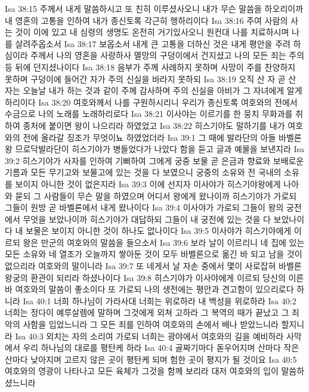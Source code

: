 Isa 38:15  주께서 내게 말씀하시고 또 친히 이루셨사오니 내가 무슨 말씀을 하오리이까 내 영혼의 고통을 인하여 내가 종신토록 각근히 행하리이다
Isa 38:16  주여 사람의 사는 것이 이에 있고 내 심령의 생명도 온전히 거기있사오니 원컨대 나를 치료하시며 나를 살려주옵소서
Isa 38:17  보옵소서 내게 큰 고통을 더하신 것은 내게 평안을 주려 하심이라 주께서 나의 영혼을 사랑하사 멸망의 구덩이에서 건지셨고 나의 모든 죄는 주의 등 뒤에 던지셨나이다
Isa 38:18  음부가 주께 사례하지 못하며 사망이 주를 찬양하지 못하며 구덩이에 들어간 자가 주의 신실을 바라지 못하되
Isa 38:19  오직 산 자 곧 산 자는 오늘날 내가 하는 것과 같이 주께 감사하며 주의 신실을 아비가 그 자녀에게 알게 하리이다
Isa 38:20  여호와께서 나를 구원하시리니 우리가 종신토록 여호와의 전에서 수금으로 나의 노래를 노래하리로다
Isa 38:21  이사야는 이르기를 한 뭉치 무화과를 취하여 종처에 붙이면 왕이 나으리라 하였었고
Isa 38:22  히스기야도 말하기를 내가 여호와의 전에 올라갈 징조가 무엇이뇨 하였었더라
Isa 39:1  그 때에 발라단의 아들 바벨론 왕 므로닥발라단이 히스기야가 병들었다가 나았다 함을 듣고 글과 예물을 보낸지라
Isa 39:2  히스기야가 사자를 인하여 기뻐하여 그에게 궁중 보물 곧 은금과 향료와 보배로운 기름과 모든 무기고와 보물고에 있는 것을 다 보였으니 궁중의 소유와 전 국내의 소유를 보이지 아니한 것이 없은지라
Isa 39:3  이에 선지자 이사야가 히스기야왕에게 나아와 묻되 그 사람들이 무슨 말을 하였으며 어디서 왕에게 왔나이까 히스기야가 가로되 그들이 원방 곧 바벨론에서 내게 왔나이다
Isa 39:4  이사야가 가로되 그들이 왕의 궁전에서 무엇을 보았나이까 히스기야가 대답하되 그들이 내 궁전에 있는 것을 다 보았나이다 내 보물은 보이지 아니한 것이 하나도 없나이다
Isa 39:5  이사야가 히스기야에게 이르되 왕은 만군의 여호와의 말씀을 들으소서
Isa 39:6  보라 날이 이르리니 네 집에 있는 모든 소유와 네 열조가 오늘까지 쌓아둔 것이 모두 바벨론으로 옮긴 바 되고 남을 것이 없으리라 여호와의 말이니라
Isa 39:7  또 네게서 날 자손 중에서 몇이 사로잡혀 바벨론 왕궁의 환관이 되리라 하셨나이다
Isa 39:8  히스기야가 이사야에게 이르되 당신의 이른바 여호와의 말씀이 좋소이다 또 가로되 나의 생전에는 평안과 견고함이 있으리로다 하니라
Isa 40:1  너희 하나님이 가라사대 너희는 위로하라 내 백성을 위로하라
Isa 40:2  너희는 정다이 예루살렘에 말하며 그것에게 외쳐 고하라 그 복역의 때가 끝났고 그 죄악의 사함을 입었느니라 그 모든 죄를 인하여 여호와의 손에서 배나 받았느니라 할지니라
Isa 40:3  외치는 자의 소리여 가로되 너희는 광야에서 여호와의 길을 예비하라 사막에서 우리 하나님의 대로를 평탄케 하라
Isa 40:4  골짜기마다 돋우어지며 산마다 작은 산마다 낮아지며 고르지 않은 곳이 평탄케 되며 험한 곳이 평지가 될 것이요
Isa 40:5  여호와의 영광이 나타나고 모든 육체가 그것을 함께 보리라 대저 여호와의 입이 말씀하셨느니라
